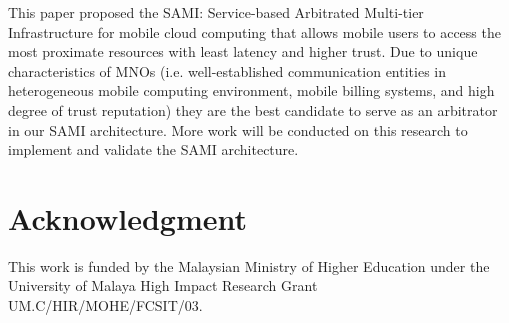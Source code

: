 \documentclass[conference]{IEEEtran}
\begin{document}
This paper proposed the SAMI: Service-based Arbitrated Multi-tier Infrastructure for mobile cloud computing that allows mobile users to access the most proximate resources with least latency and higher trust. Due to unique characteristics of MNOs (i.e. well-established communication entities in heterogeneous mobile computing environment, mobile billing systems, and high degree of trust reputation) they are the best candidate to serve as an arbitrator in our SAMI architecture. More work will be conducted on this research to implement and validate the SAMI architecture.

\section*{Acknowledgment}
This work is funded by the Malaysian Ministry of Higher Education under the University of Malaya High Impact Research Grant UM.C/HIR/MOHE/FCSIT/03.




\end{document}
